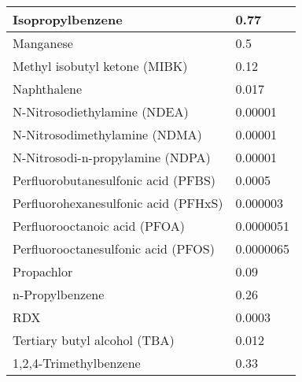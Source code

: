 \begin{table}[]
\begin{center}
\begin{tabular}{|l|l|}
Isopropylbenzene                        & 0.77                                                                      \\ \hline
Manganese                               & 0.5                                                                       \\ \hline
Methyl isobutyl ketone (MIBK)           & 0.12                                                                      \\ \hline
Naphthalene                             & 0.017                                                                     \\ \hline
N-Nitrosodiethylamine (NDEA)            & 0.00001                                                                   \\ \hline
N-Nitrosodimethylamine (NDMA)           & 0.00001                                                                   \\ \hline
N-Nitrosodi-n-propylamine (NDPA)        & 0.00001                                                                   \\ \hline
Perfluorobutanesulfonic acid (PFBS)     & 0.0005                                                                    \\ \hline
Perfluorohexanesulfonic acid (PFHxS)    & 0.000003                                                                  \\ \hline
Perfluorooctanoic acid (PFOA)           & 0.0000051                                                                 \\ \hline
Perfluorooctanesulfonic acid (PFOS)     & 0.0000065                                                                 \\ \hline
Propachlor                              & 0.09                                                                      \\ \hline
n-Propylbenzene                         & 0.26                                                                      \\ \hline
RDX                                     & 0.0003                                                                    \\ \hline
Tertiary butyl alcohol (TBA)            & 0.012                                                                     \\ \hline
1,2,4-Trimethylbenzene                  & 0.33                                                                      \\ \hline

\end{tabular}
\end{center}
\end{table}
